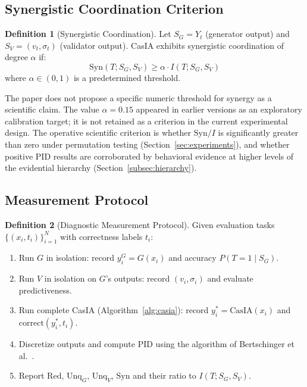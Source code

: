 \documentclass[11pt,a4paper]{article}
\theoremstyle{definition}
\newtheorem{definition}{Definition}[section]
\begin{document}
\subsection{Synergistic Coordination Criterion}

\begin{definition}[Synergistic Coordination]
\label{def:syncoord}
Let $S_G = Y_t$ (generator output) and $S_V = (v_t, \sigma_t)$ (validator output). CasIA exhibits synergistic coordination of degree $\alpha$ if:
\begin{equation}
\mathrm{Syn}(T; S_G, S_V) \geq \alpha \cdot I(T; S_G, S_V)
\end{equation}
where $\alpha \in (0,1)$ is a predetermined threshold.
\end{definition}

The paper does not propose a specific numeric threshold for synergy as a scientific claim. The value $\alpha = 0.15$ appeared in earlier versions as an exploratory calibration target; it is not retained as a criterion in the current experimental design. The operative scientific criterion is whether $\mathrm{Syn}/I$ is significantly greater than zero under permutation testing (Section~\ref{sec:experiments}), and whether positive PID results are corroborated by behavioral evidence at higher levels of the evidential hierarchy (Section~\ref{subsec:hierarchy}).

\subsection{Measurement Protocol}

\begin{definition}[Diagnostic Measurement Protocol]
\label{def:measprotocol}
Given evaluation tasks $\{(x_i, t_i)\}_{i=1}^N$ with correctness labels $t_i$:
\begin{enumerate}[leftmargin=*,itemsep=2pt]
\item Run $G$ in isolation: record $y_i^G = G(x_i)$ and accuracy $P(T=1 \mid S_G)$.
\item Run $V$ in isolation on $G$'s outputs: record $(v_i, \sigma_i)$ and evaluate predictiveness.
\item Run complete CasIA (Algorithm~\ref{alg:casia}): record $y_i^* = \text{CasIA}(x_i)$ and $\text{correct}(y_i^*, t_i)$.
\item Discretize outputs and compute PID using the algorithm of Bertschinger et al.~\cite{bertschinger2014pid}.
\item Report $\mathrm{Red}$, $\mathrm{Unq}_G$, $\mathrm{Unq}_V$, $\mathrm{Syn}$ and their ratio to $I(T; S_G, S_V)$.
\end{enumerate}
\end{definition}
\end{document}
